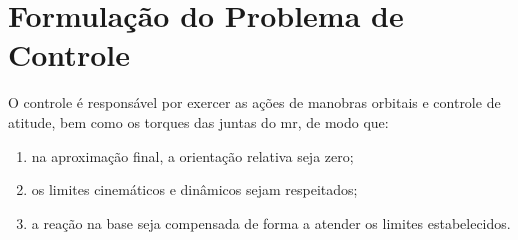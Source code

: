 \section{Formulação do Problema de Controle}
\label{sec:definicao_problema_controle}

O controle é responsável por exercer as ações de manobras orbitais e controle de atitude, bem como os torques das juntas do \gls{mr}, de modo que:

\begin{enumerate}[label=(\roman*)]
  \item na aproximação final, a orientação relativa seja zero;
  \item os limites cinemáticos e dinâmicos sejam respeitados;
  \item a reação na base seja compensada de forma a atender os limites estabelecidos.
\end{enumerate}






